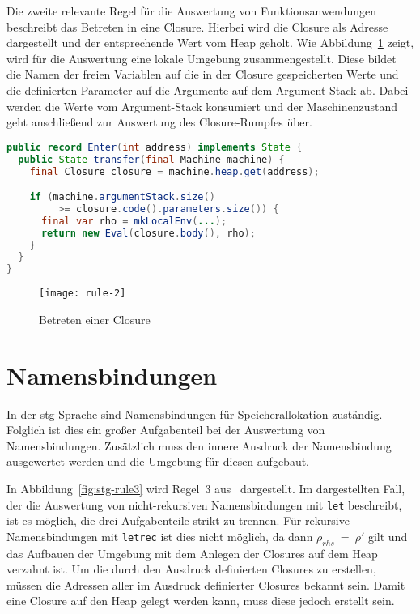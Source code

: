 Die zweite relevante Regel für die Auswertung von Funktionsanwendungen beschreibt das Betreten in eine Closure.
Hierbei wird die Closure als Adresse dargestellt und der entsprechende Wert vom Heap geholt.
Wie Abbildung~\ref{fig:rule-2} zeigt, wird für die Auswertung eine lokale Umgebung zusammengestellt.
Diese bildet die Namen der freien Variablen auf die in der Closure gespeicherten Werte und die definierten Parameter auf die Argumente auf dem Argument-Stack ab.
Dabei werden die Werte vom Argument-Stack konsumiert und der Maschinenzustand geht anschließend zur Auswertung des Closure-Rumpfes über.

\pagebreak

\begin{lstlisting}[language=java,morekeywords={record}, caption={Implementierung des Betretens einer Closure}]
public record Enter(int address) implements State {
  public State transfer(final Machine machine) {
    final Closure closure = machine.heap.get(address);

    if (machine.argumentStack.size()
         >= closure.code().parameters.size()) {
      final var rho = mkLocalEnv(...);
      return new Eval(closure.body(), rho);
    }
  }
}
\end{lstlisting}

\begin{figure}[h]
  \centering
  \texttt{[image: rule-2]}
  \caption{Betreten einer Closure}\label{fig:rule-2}
\end{figure}

\section{Namensbindungen}\label{sec:bindings}

In der \gls{stg}-Sprache sind Namensbindungen für Speicherallokation zuständig.
Folglich ist dies ein großer Aufgabenteil bei der Auswertung von Namensbindungen.
Zusätzlich muss den innere Ausdruck der Namensbindung ausgewertet werden und die Umgebung für diesen aufgebaut.

In Abbildung~\ref{fig:stg-rule3} wird Regel~3 aus~\cite{Jones_StockHardwareSTG} dargestellt.
Im dargestellten Fall, der die Auswertung von nicht-rekursiven Namensbindungen mit \texttt{let} beschreibt, ist es möglich, die drei Aufgabenteile strikt zu trennen.
Für rekursive Namensbindungen mit \texttt{letrec} ist dies nicht möglich, da dann $\rho_{rhs}\ =\ \rho'$ gilt und das Aufbauen der Umgebung mit dem Anlegen der Closures auf dem Heap verzahnt ist.
Um die durch den Ausdruck definierten Closures zu erstellen, müssen die Adressen aller im Ausdruck definierter Closures bekannt sein.
Damit eine Closure auf den Heap gelegt werden kann, muss diese jedoch erstellt sein.

